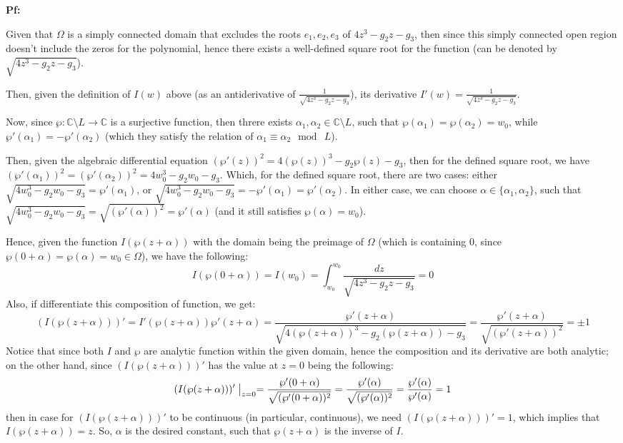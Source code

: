 \documentclass{article}
\begin{document}
\textbf{Pf:}

Given that $\Omega$ is a simply connected domain that excludes the roots $e_1,e_2,e_3$ of $4z^3-g_2z-g_3$,
then since this simply connected open region doesn't include the zeros for the polynomial, hence there exists a well-defined square root for the function
(can be denoted by $\sqrt{4z^3-g_2z-g_3}$).

Then, given the definition of $I(w)$ above (as an antiderivative of $\frac{1}{\sqrt{4z^3-g_2z-g_3}}$), its derivative $I'(w)=\frac{1}{\sqrt{4z^3-g_2z-g_3}}$.

\hfil

Now, since $\wp:\mathbb{C}\setminus L\rightarrow\mathbb{C}$ is a surjective function, then threre exists $\alpha_1,\alpha_2\in \mathbb{C}\setminus L$, such that $\wp(\alpha_1)=\wp(\alpha_2)=w_0$,
while $\wp'(\alpha_1) = -\wp'(\alpha_2)$ (which they satisfy the relation of $\alpha_1\equiv \alpha_2\mod\ L$).

Then, given the algebraic differential equation $(\wp'(z))^2=4(\wp(z))^3-g_2\wp(z)-g_3$, then for the defined square root, we have $(\wp'(\alpha_1))^2=(\wp'(\alpha_2))^2 = 4w_0^3-g_2w_0-g_3$. 
Which, for the defined square root, there are two cases: either $\sqrt{4w_0^3-g_2w_0-g_3} = \wp'(\alpha_1)$, or $\sqrt{4w_0^3-g_2w_0-g_3} = -\wp'(\alpha_1) = \wp'(\alpha_2)$.
In either case, we can choose $\alpha\in \{\alpha_1,\alpha_2\}$, such that $\sqrt{4w_0^3-g_2w_0-g_3} = \sqrt{(\wp'(\alpha))^2} = \wp'(\alpha)$ (and it still satisfies $\wp(\alpha)=w_0$).

Hence, given the function $I(\wp(z+\alpha))$ with the domain being the preimage of $\Omega$ (which is containing $0$, since $\wp(0+\alpha)=\wp(\alpha)=w_0\in\Omega$), we have the following:
$$I(\wp(0+\alpha)) = I(w_0)=\int_{w_0}^{w_0}\frac{dz}{\sqrt{4z^3-g_2z-g_3}} = 0$$
Also, if differentiate this composition of function, we get:
$$(I(\wp(z+\alpha)))' = I'(\wp(z+\alpha))\wp'(z+\alpha) = \frac{\wp'(z+\alpha)}{\sqrt{4(\wp(z+\alpha))^3-g_2(\wp(z+\alpha))-g_3}} = \frac{\wp'(z+\alpha)}{\sqrt{(\wp'(z+\alpha))^2}} = \pm 1$$
Notice that since both $I$ and $\wp$ are analytic function within the given domain, hence the composition and its derivative are both analytic;
on the other hand, since $(I(\wp(z+\alpha)))'$ has the value at $z=0$ being the following:
$$(I(\wp(z+\alpha)))'\bigm|_{z=0} = \frac{\wp'(0+\alpha)}{\sqrt{(\wp'(0+\alpha))^2}} = \frac{\wp'(\alpha)}{\sqrt{(\wp'(\alpha))^2}} = \frac{\wp'(\alpha)}{\wp'(\alpha)}=1$$
then in case for $(I(\wp(z+\alpha)))'$ to be continuous (in particular, continuous), we need $(I(\wp(z+\alpha)))' = 1$, which implies that $I(\wp(z+\alpha))=z$.
So, $\alpha$ is the desired constant, such that $\wp(z+\alpha)$ is the inverse of $I$.
\end{document}

